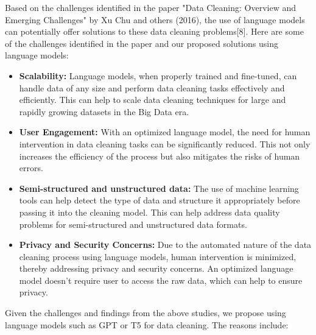 \documentclass{article}
\begin{document}
Based on the challenges identified in the paper "Data Cleaning: Overview and Emerging Challenges" by Xu Chu and others (2016), the use of language models can potentially offer solutions to these data cleaning problems[8]. Here are some of the challenges identified in the paper and our proposed solutions using language models:

\begin{itemize}
    \item \textbf{Scalability:} Language models, when properly trained and fine-tuned, can handle data of any size and perform data cleaning tasks effectively and efficiently. This can help to scale data cleaning techniques for large and rapidly growing datasets in the Big Data era.
    
    \item \textbf{User Engagement:} With an optimized language model, the need for human intervention in data cleaning tasks can be significantly reduced. This not only increases the efficiency of the process but also mitigates the risks of human errors.
    
    \item \textbf{Semi-structured and unstructured data:} The use of machine learning tools can help detect the type of data and structure it appropriately before passing it into the cleaning model. This can help address data quality problems for semi-structured and unstructured data formats.
    
    \item \textbf{Privacy and Security Concerns:} Due to the automated nature of the data cleaning process using language models, human intervention is minimized, thereby addressing privacy and security concerns. An optimized language model doesn't require user to access the raw data, which can help to ensure privacy.
\end{itemize}

Given the challenges and findings from the above studies, we propose using language models such as GPT or T5 for data cleaning. The reasons include:
\end{document}
